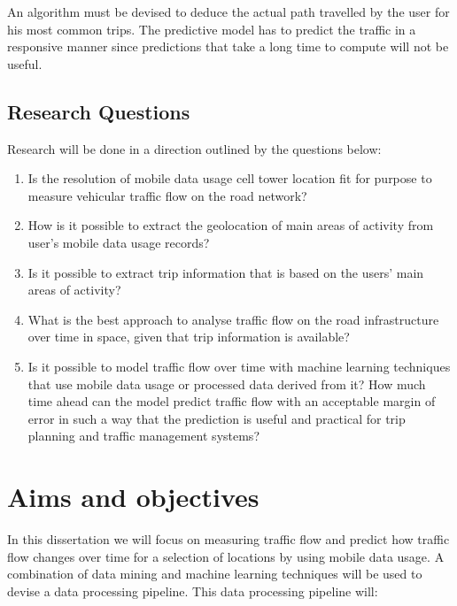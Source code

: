 \documentclass[12pt, a4paper]{report}
\theoremstyle{definition}
\theoremstyle{definition}%
\theoremstyle{definition}%
\theoremstyle{definition}%
\theoremstyle{definition}%
\theoremstyle{definition}%
\begin{document}
An algorithm must be devised to deduce the actual path travelled by the user for his most common trips. The predictive model has to predict the traffic in a responsive manner since predictions that take a long time to compute will not be useful.


\subsection{Research Questions}

Research will be done in a direction outlined by the questions below:
\begin{enumerate}
	\item Is the resolution of mobile data usage cell tower location fit for purpose to measure vehicular traffic flow on the road network?
	
	\item How is it possible to extract the geolocation of main areas of activity from user's mobile data usage records?
	
	\item Is it possible to extract trip information that is based on the users' main areas of activity?
	
	\item What is the best approach to analyse traffic flow on the road infrastructure over time in space, given that trip information is available? 

	\item Is it possible to model traffic flow over time with machine learning techniques that use mobile data usage or processed data derived from it? How much time ahead can the model predict traffic flow with an acceptable margin of error in such a way that the prediction is useful and practical for trip planning and traffic management systems?
\end{enumerate}




\section{Aims and objectives} \label{section:introduction:aims_objectives}

In this dissertation we will focus on measuring traffic flow and predict how traffic flow changes over time for a selection of locations by using mobile data usage. A combination of data mining and machine learning techniques will be used to devise a data processing pipeline. This data processing pipeline will:
\end{document}
